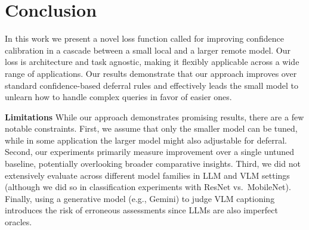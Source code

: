 \section{Conclusion}

In this work we present a novel loss function called \loss for improving confidence calibration in a cascade between a small local and a larger remote model. Our loss is architecture and task agnostic, making it flexibly applicable across a wide range of applications. Our results demonstrate that our approach improves over standard confidence-based deferral rules and effectively leads the small model to unlearn how to handle complex queries in favor of easier ones. 

\textbf{Limitations} While our approach demonstrates promising results, there are a few notable constraints. First, we assume that only the smaller model can be tuned, while in some application the larger model might also adjustable for deferral. Second, our experiments primarily measure improvement over a single untuned baseline, potentially overlooking broader comparative insights. Third, we did not extensively evaluate across different model families in LLM and VLM settings (although we did so in classification experiments with ResNet vs.\ MobileNet). Finally, using a generative model (e.g., Gemini) to judge VLM captioning introduces the risk of erroneous assessments since LLMs are also imperfect oracles.